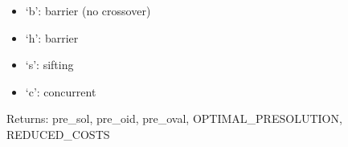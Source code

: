 \documentclass[letterpaper,10pt,english]{sphinxmanual}
\begin{document}
\begin{fulllineitems}
\begin{itemize}
\begin{itemize}
\item {} 
\sphinxAtStartPar
‘b’: barrier (no crossover)

\item {} 
\sphinxAtStartPar
‘h’: barrier

\item {} 
\sphinxAtStartPar
‘s’: sifting

\item {} 
\sphinxAtStartPar
‘c’: concurrent

\end{itemize}

\end{itemize}

\sphinxAtStartPar
Returns: pre\_sol, pre\_oid, pre\_oval, OPTIMAL\_PRESOLUTION, REDUCED\_COSTS

\end{fulllineitems}

\end{document}
